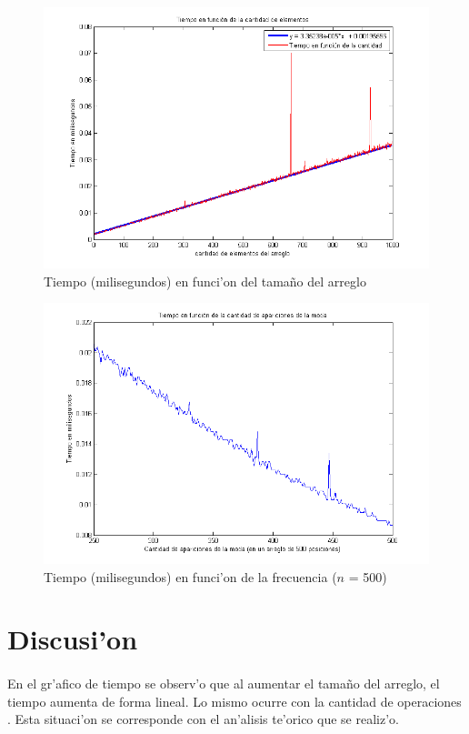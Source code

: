 \begin{figure}[H]
\centering
\includegraphics[scale=0.7]{../../codigo/ejercicio3/benchmark_de_tiempo/graficos/moda-1000-casos.png}
\caption{Tiempo (milisegundos) en funci'on del tama\~{n}o del arreglo}
\label{Ej3fig3}
\end{figure}

\begin{figure}[H]
\centering
\includegraphics[scale=0.7]{../../codigo/ejercicio3/benchmark_de_tiempo/graficos/aumento-frecuencia.png}
\caption{Tiempo (milisegundos) en funci'on de la frecuencia ($n$ = 500)}
\label{Ej3fig4}
\end{figure}
\newpage
\section{Discusi'on}
\paragraph{}
En el gr'afico de tiempo se observ'o que al aumentar el tama\~{n}o del arreglo, el tiempo 
aumenta de forma lineal. Lo mismo ocurre con la cantidad de operaciones . Esta situaci'on se 
corresponde con el an'alisis te'orico que se realiz'o. 
